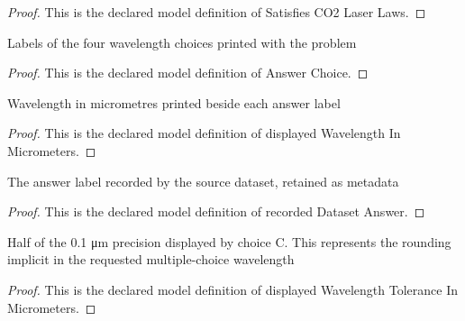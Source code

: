 \begin{proof}
  This is the declared model definition of Satisfies CO2 Laser Laws.
\end{proof}
\begin{definition}
  \label{def:physics:phyx-mini-0579:phyxminiproblems-problemphyxmini0579-answerchoice}
  Labels of the four wavelength choices printed with the problem
\end{definition}
\begin{proof}
  This is the declared model definition of Answer Choice.
\end{proof}
\begin{definition}
  \label{def:physics:phyx-mini-0579:phyxminiproblems-problemphyxmini0579-displayedwavelengthinmicrometers}
  Wavelength in micrometres printed beside each answer label
\end{definition}
\begin{proof}
  This is the declared model definition of displayed Wavelength In Micrometers.
\end{proof}
\begin{definition}
  \label{def:physics:phyx-mini-0579:phyxminiproblems-problemphyxmini0579-recordeddatasetanswer}
  The answer label recorded by the source dataset, retained as metadata
\end{definition}
\begin{proof}
  This is the declared model definition of recorded Dataset Answer.
\end{proof}
\begin{definition}
  \label{def:physics:phyx-mini-0579:phyxminiproblems-problemphyxmini0579-displayedwavelengthtoleranceinmicrometers}
  Half of the 0.1 μm precision displayed by choice C. This represents the rounding implicit in the requested multiple-choice wavelength
\end{definition}
\begin{proof}
  This is the declared model definition of displayed Wavelength Tolerance In Micrometers.
\end{proof}
